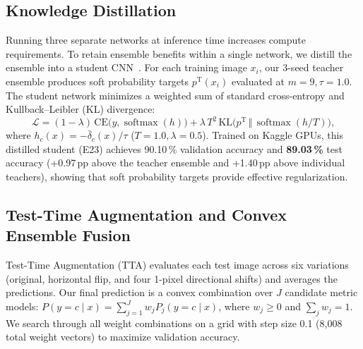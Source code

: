 \documentclass[10pt,a4paper]{article}
\begin{document}
\subsection{Knowledge Distillation}\label{sec:distill}
Running three separate networks at inference time increases compute requirements. To retain ensemble benefits within a single network, we distill the ensemble into a student CNN~\cite{hinton2015}. For each training image $x_i$, our 3-seed teacher ensemble produces soft probability targets $p^{\mathrm{T}}(x_i)$ evaluated at $m=9, \tau=1.0$. The student network minimizes a weighted sum of standard cross-entropy and Kullback--Leibler (KL) divergence:
\begin{equation}
\mathcal{L} = (1-\lambda)\,\mathrm{CE}\big(y, \operatorname{softmax}(h)\big) + \lambda\,T^{2}\,\mathrm{KL}\big(p^{\mathrm{T}} \,\Vert\, \operatorname{softmax}(h/T)\big),
\end{equation}
where $h_c(x)=-\bar\delta_c(x)/\tau$ ($T=1.0, \lambda=0.5$). Trained on Kaggle GPUs, this distilled student (E23) achieves 90.10\,\% validation accuracy and \textbf{89.03\,\%} test accuracy (+0.97\,pp above the teacher ensemble and +1.40\,pp above individual teachers), showing that soft probability targets provide effective regularization.

\subsection{Test-Time Augmentation and Convex Ensemble Fusion}\label{sec:fusion}
Test-Time Augmentation (TTA) evaluates each test image across six variations (original, horizontal flip, and four 1-pixel directional shifts) and averages the predictions. Our final prediction is a convex combination over $J$ candidate metric models:
$P(y=c\mid x) = \sum_{j=1}^{J} w_j P_j(y=c\mid x)$, where $w_j \ge 0$ and $\sum_j w_j = 1$.
We search through all weight combinations on a grid with step size 0.1 (8{,}008 total weight vectors) to maximize validation accuracy.
\end{document}
